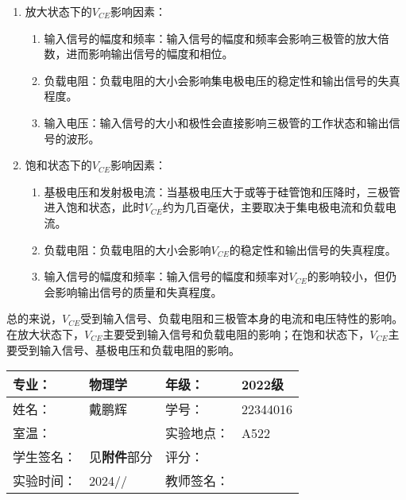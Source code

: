 \documentclass[dvipsnames, svgnames,a4paper,11pt]{article}
\begin{document}
		\begin{enumerate}
			\item 放大状态下的$V_{CE}$影响因素：
				\begin{enumerate}
					\item 输入信号的幅度和频率：输入信号的幅度和频率会影响三极管的放大倍数，进而影响输出信号的幅度和相位。
					\item 负载电阻：负载电阻的大小会影响集电极电压的稳定性和输出信号的失真程度。
					\item 输入电压：输入信号的大小和极性会直接影响三极管的工作状态和输出信号的波形。
				\end{enumerate}

			\item 饱和状态下的$V_{CE}$影响因素：
				\begin{enumerate}
					\item 基极电压和发射极电流：当基极电压大于或等于硅管饱和压降时，三极管进入饱和状态，此时$V_{CE}$约为几百毫伏，主要取决于集电极电流和负载电流。
					\item 负载电阻：负载电阻的大小会影响$V_{CE}$的稳定性和输出信号的失真程度。
					\item 输入信号的幅度和频率：输入信号的幅度和频率对$V_{CE}$的影响较小，但仍会影响输出信号的质量和失真程度。
				\end{enumerate}

			
		\end{enumerate}



		总的来说，$V_{CE}$受到输入信号、负载电阻和三极管本身的电流和电压特性的影响。在放大状态下，$V_{CE}$主要受到输入信号和负载电阻的影响；在饱和状态下，$V_{CE}$主要受到输入信号、基极电压和负载电阻的影响。

	
	
	
	\clearpage
	
	\begin{table}
		\renewcommand\arraystretch{1.7}
		\centering
		\begin{tabularx}{\textwidth}{|X|X|X|X|}
			\hline
			专业： & 物理学 & 年级： & 2022级 \\
			\hline
			姓名： & 戴鹏辉 & 学号： & 22344016\\
			\hline
			室温： &  & 实验地点： & A522 \\
			\hline
			学生签名：& 见\textbf{附件}部分 & 评分： &\\
			\hline
			实验时间：& 2024// & 教师签名：&\\
			\hline
		\end{tabularx}
	\end{table}
	
\end{document}

